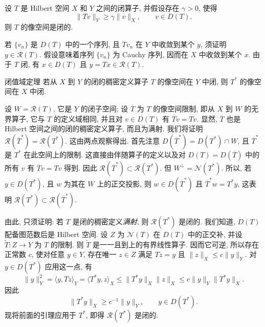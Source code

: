 
\begin{Lemma}\label{lem:operator-lower-bound-closed-range}
{设 $T$ 是 Hilbert 空间 $X$ 和 $Y$ 之间的闭算子, 并假设存在 $\gamma>0$, 使得}
\[
\|Tv\|_Y\geq\gamma\|v\|_X,\qquad v\in D(T).
\]
{则 $T$ 的像空间是闭的.}
\end{Lemma}

\begin{Proof}
{若 $\{v_n\}$ 是 $D(T)$ 中的一个序列, 且 $Tv_n$ 在 $Y$ 中收敛到某个 $y$, 须证明 $y\in\mathcal R(T)$. 假设意味着序列 $\{v_n\}$ 为 Cauchy 序列, 因而在 $X$ 中收敛到某个 $x$. 由于 $T$ 闭, 有 $x\in D(T)$ 且 $y=Tx\in\mathcal R(T)$.}
\end{Proof}


\begin{Theorem}{{闭值域定理}}\label{thm:closed-range}
{若从 $X$ 到 $Y$ 的闭的稠密定义算子 $T$ 的像空间在 $Y$ 中闭, 则 $T^*$ 的像空间在 $X$ 中闭.}
\end{Theorem}

\begin{Proof}
{设 $W=\mathcal R(T)$, 它是 $Y$ 的闭子空间; 设 $\overline T$ 为 $T$ 的像空间限制, 即从 $X$ 到 $W$ 的无界算子, 它与 $T$ 的定义域相同, 并且对 $v\in D(T)$ 有 $\overline Tv=Tv$. 显然, $\overline T$ 也是 Hilbert 空间之间的闭的稠密定义算子, 而且为满射. 我们将证明 $\mathcal R(\overline T^*)=\mathcal R(T^*)$. 这由两点观察得出. 首先注意 $D(\overline T^*)=D(T^*)\cap W$, 且 $\overline T^*$ 是 $T^*$ 在此空间上的限制. 这直接由伴随算子的定义以及对 $D(T)=D(\overline T)$ 中的所有 $v$ 有 $\overline Tv=Tv$ 得到. 因此 $\mathcal R(\overline T^*)\subset\mathcal R(T^*)$. 但 $W^\perp=\mathcal N(T^*)$. 所以, 若 $y\in D(T^*)$, 且 $w$ 为其在 $W$ 上的正交投影, 则 $w\in D(\overline T^*)$ 且 $\overline T^*w=T^*y$, 这表明 $\mathcal R(T^*)\subset\mathcal R(\overline T^*)$.}

{由此, 只须证明: 若 $T$ 是闭的稠密定义\emph{满射}, 则 $\mathcal R(T^*)$ 是闭的. 我们知道, $D(T)$ 配备图范数后是 Hilbert 空间. 设 $Z$ 为 $\mathcal N(T)$ 在 $D(T)$ 中的正交补, 并设 $\widetilde T:Z\to Y$ 为 $T$ 的限制. 则 $\widetilde T$ 是一一且到上的有界线性算子. 因而它可逆, 所以存在正常数 $c$, 使对任意 $y\in Y$, 存在唯一 $z\in Z$ 满足 $Tz=y$ 且 $\|z\|_X\leq c\|y\|_Y$. 对 $y\in D(T^*)$ 应用这一点, 有}
\[
\|y\|_Y^2=\langle y,Tz\rangle_Y=\langle T^*y,z\rangle_X\leq\|T^*y\|_X\|z\|_X\leq c\|y\|_Y\|T^*y\|_X.
\]
{因此}
\[
\|T^*y\|_X\geq c^{-1}\|y\|_Y,\qquad y\in D(T^*).
\]
{现将前面的引理应用于 $T^*$, 即得 $\mathcal R(T^*)$ 是闭的.}
\end{Proof}

